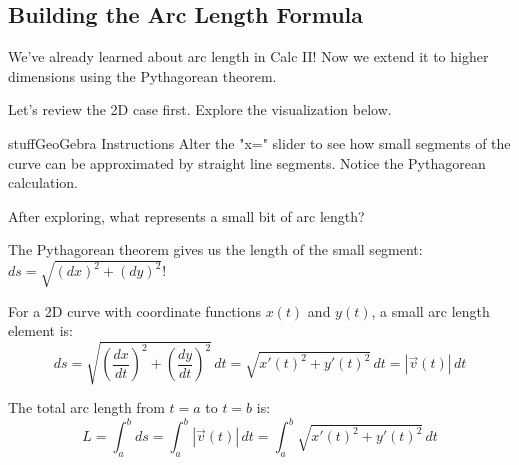 \documentclass{ximera}
\begin{document}
\subsection*{Building the Arc Length Formula}

We've already learned about arc length in Calc II! Now we extend it to higher dimensions using the Pythagorean theorem.

\begin{problem}
Let's review the 2D case first. Explore the visualization below.

\begin{expandable}{stuff}{GeoGebra Instructions}
    Alter the "x=" slider to see how small segments of the curve can be approximated by straight line segments. Notice the Pythagorean calculation.
\end{expandable}

\begin{center}
\end{center}

After exploring, what represents a small bit of arc length?
\begin{multipleChoice}
\end{multipleChoice}

\begin{feedback}
The Pythagorean theorem gives us the length of the small segment: $ds = \sqrt{(dx)^2 + (dy)^2}$!
\end{feedback}
\end{problem}

\begin{definition}
For a 2D curve with coordinate functions $x(t)$ and $y(t)$, a small arc length element is:
$$ds=\sqrt{\left(\frac{dx}{dt}\right)^2+\left(\frac{dy}{dt}\right)^2} \, dt=\sqrt{x'(t)^2+y'(t)^2} \, dt = |\vec{v}(t)| \, dt$$

The total arc length from $t=a$ to $t=b$ is:
$$L = \int_a^b ds = \int_a^b |\vec{v}(t)| \, dt = \int_a^b \sqrt{x'(t)^2+y'(t)^2} \, dt$$
\end{definition}
\end{document}
